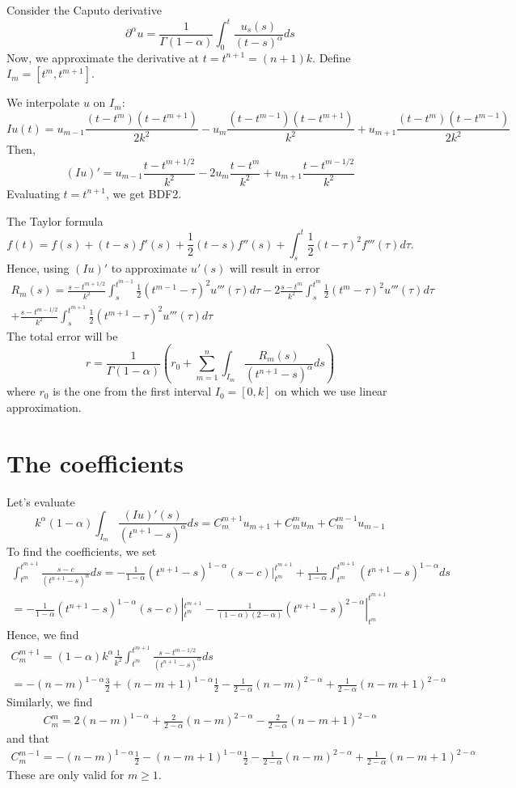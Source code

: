 \documentclass[11pt]{article}
\begin{document}
Consider the Caputo derivative $$
\partial^{\alpha}u=\frac{1}{\Gamma(1-\alpha)}\int_0^t\frac{u_s(s)}{(t-s)^{\alpha}}ds
$$
Now, we approximate the derivative at $t=t^{n+1}=(n+1)k$. Define $I_m=[t^m, t^{m+1}]$.

We interpolate $u$ on $I_m$: $$
Iu(t)=u_{m-1}\frac{(t-t^m)(t-t^{m+1})}{2k^2}-u_m\frac{(t-t^{m-1})(t-t^{m+1})}{k^2}+u_{m+1}\frac{(t-t^m)(t-t^{m-1})}{2k^2}
$$
Then, $$
(Iu)'=u_{m-1}\frac{t-t^{m+1/2}}{k^2}-2u_m\frac{t-t^m}{k^2}+u_{m+1}\frac{t-t^{m-1/2}}{k^2}
$$
Evaluating $t=t^{n+1}$, we get BDF2.

The Taylor formula $$
f(t)=f(s)+(t-s)f'(s)+\frac{1}{2}(t-s)f''(s)+\int_s^t\frac{1}{2}(t-\tau)^2 f'''(\tau)d\tau.
$$
Hence, using $(Iu)'$ to approximate $u'(s)$ will result in error 
\begin{multline*}
R_m(s)=\frac{s-t^{m+1/2}}{k^2}\int_s^{t^{m-1}}\frac{1}{2}(t^{m-1}-\tau)^2 u'''(\tau)d\tau-2\frac{s-t^m}{k^2}\int_s^{t^m}\frac{1}{2}(t^m-\tau)^2 u'''(\tau)d\tau\\
+\frac{s-t^{m-1/2}}{k^2}\int_s^{t^{m+1}}\frac{1}{2}(t^{m+1}-\tau)^2 u'''(\tau)d\tau
\end{multline*}
The total error will be $$
r=\frac{1}{\Gamma(1-\alpha)}(r_0+\sum_{m=1}^n\int_{I_m}\frac{R_m(s)}{(t^{n+1}-s)^{\alpha}}ds)
$$
where $r_0$ is the one from the first interval $I_0=[0, k]$ on which we use linear approximation.

\section{The coefficients}
Let's evaluate $$
k^{\alpha}(1-\alpha)\int_{I_m}\frac{(Iu)'(s)}{(t^{n+1}-s)^{\alpha}}ds=C_m^{m+1}u_{m+1}+C_m^mu_m+C_{m}^{m-1}u_{m-1}
$$
To find the coefficients, we set 
\begin{multline*}
\int_{t^m}^{t^{m+1}}\frac{s-c}{(t^{n+1}-s)^{\alpha}}ds
=-\frac{1}{1-\alpha}(t^{n+1}-s)^{1-\alpha}(s-c)|_{t^m}^{t^{m+1}}
+\frac{1}{1-\alpha}\int_{t^m}^{t^{m+1}}(t^{n+1}-s)^{1-\alpha}ds\\
=-\frac{1}{1-\alpha}(t^{n+1}-s)^{1-\alpha}(s-c)|_{t^m}^{t^{m+1}}
-\frac{1}{(1-\alpha)(2-\alpha)}(t^{n+1}-s)^{2-\alpha}|_{t^m}^{t^{m+1}}
\end{multline*}
Hence, we find 
\begin{multline*}
C_m^{m+1}=(1-\alpha)k^{\alpha}\frac{1}{k^2}\int_{t^m}^{t^{m+1}}\frac{s-t^{m-1/2}}{(t^{n+1}-s)^{\alpha}}ds\\
=-(n-m)^{1-\alpha}\frac{3}{2}+(n-m+1)^{1-\alpha}\frac{1}{2}
-\frac{1}{2-\alpha}(n-m)^{2-\alpha}+\frac{1}{2-\alpha}(n-m+1)^{2-\alpha}
\end{multline*}
Similarly, we find 
\begin{gather*}
C_m^m=2(n-m)^{1-\alpha}+\frac{2}{2-\alpha}(n-m)^{2-\alpha}
-\frac{2}{2-\alpha}(n-m+1)^{2-\alpha}
\end{gather*}
and that
\begin{multline*}
C_m^{m-1}=-(n-m)^{1-\alpha}\frac{1}{2}-(n-m+1)^{1-\alpha}\frac{1}{2}
-\frac{1}{2-\alpha}(n-m)^{2-\alpha}+\frac{1}{2-\alpha}(n-m+1)^{2-\alpha}
\end{multline*}
These are only valid for $m\ge 1$.
\end{document}
